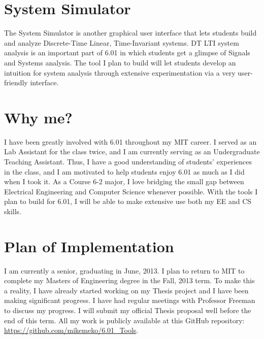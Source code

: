 \documentclass[12pt]{amsart}
\begin{document}
\section{System Simulator}
The System Simulator is another graphical user interface that lets students build and analyze Discrete-Time Linear, Time-Invariant systems. DT LTI system analysis is an important part of 6.01 in which students get a glimpse of Signals and Systems analysis. The tool I plan to build will let students develop an intuition for system analysis through extensive experimentation via a very user-friendly interface.

\section{Why me?}
I have been greatly involved with 6.01 throughout my MIT career. I served as an Lab Assistant for the class twice, and I am currently serving as an Undergraduate Teaching Assistant. Thus, I have a good understanding of students' experiences in the class, and I am motivated to help students enjoy 6.01 as much as I did when I took it. As a Course 6-2 major, I love bridging the small gap between Electrical Engineering and Computer Science whenever possible. With the tools I plan to build for 6.01, I will be able to make extensive use both my EE and CS skills.

\section{Plan of Implementation}
I am currently a senior, graduating in June, 2013. I plan to return to MIT to complete my Masters of Engineering degree in the Fall, 2013 term. To make this a reality, I have already started working on my Thesis project and I have been making significant progress. I have had regular meetings with Professor Freeman to discuss my progress. I will submit my official Thesis proposal well before the end of this term. All my work is publicly available at this GitHub repository: \url{https://github.com/mikemeko/6.01_Tools}.
\end{document}

